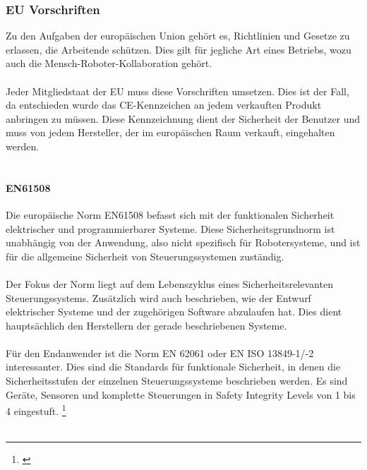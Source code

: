 \documentclass[titlepage,12pt,twoside]{article}
\begin{document}
\subsubsection{EU Vorschriften}
Zu den Aufgaben der europäischen Union gehört es, Richtlinien und Gesetze zu 
erlassen, die Arbeitende schützen. Dies gilt für jegliche Art eines Betriebs, 
wozu auch die Mensch-Roboter-Kollaboration gehört. \\
\\
Jeder Mitgliedstaat der EU muss diese Vorschriften umsetzen. Dies ist der Fall, 
da entschieden wurde das CE-Kennzeichen an jedem verkauften Produkt anbringen zu 
müssen. Diese Kennzeichnung dient der Sicherheit der Benutzer und muss von jedem 
Hersteller, der im europäischen Raum verkauft, eingehalten werden. \\
\\
\paragraph{EN61508}
\hfill \break
\hfill \break
Die europäische Norm EN61508 befasst sich mit der funktionalen Sicherheit 
elektrischer und programmierbarer Systeme. Diese Sicherheitsgrundnorm ist 
unabhängig von der Anwendung, also nicht spezifisch für Robotersysteme, und ist 
für die allgemeine Sicherheit von Steuerungssystemen zuständig. \\
\\
Der Fokus der Norm liegt auf dem Lebenszyklus eines Sicherheitsrelevanten 
Steuerungssystems. Zusätzlich wird auch beschrieben, wie der Entwurf elektrischer 
Systeme und der zugehörigen Software abzulaufen hat. Dies dient hauptsächlich den 
Herstellern der gerade beschriebenen Systeme. \\
\\
Für den Endanwender ist die Norm EN 62061 oder EN ISO 13849-1/-2 interessanter. 
Dies sind die Standards für funktionale Sicherheit, in denen die Sicherheitsstufen 
der einzelnen Steuerungssysteme beschrieben werden. Es sind Geräte, Sensoren und 
komplette Steuerungen in Safety Integrity Levels von 1 bis 4 eingestuft. \footnote{\cite{Pilz}}\\
\\
\end{document}
